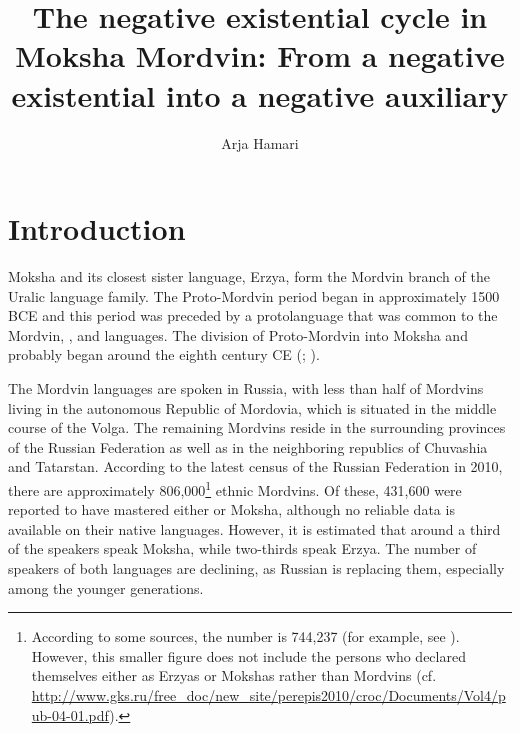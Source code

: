 \documentclass[output=paper,colorlinks,citecolor=brown,draft,draftmode]{langscibook}
\author{Arja Hamari\affiliation{University of Helsinki}}
\title{The negative existential cycle in Moksha Mordvin: From a negative existential into a negative auxiliary}
\begin{document}
\maketitle

\section{Introduction}

Moksha and its closest sister language, Erzya, form the Mordvin branch of the Uralic language family. The Proto-Mordvin period began in approximately 1500 BCE and this period was preceded by a protolanguage that was common to the Mordvin, , and  languages. The division of Proto-Mordvin into Moksha and  probably began around the eighth century CE (\citealt[13--15]{Bartens1999}; \citealt[13–14]{Keresztes2011}).

  The Mordvin languages are spoken in Russia, with less than half of Mordvins living in the autonomous Republic of Mordovia, which is situated in the middle course of the Volga. The remaining Mordvins reside in the surrounding provinces of the Russian Federation as well as in the neighboring republics of Chuvashia and Tatarstan. According to the latest census of the Russian Federation in 2010, there are approximately 806,000\footnote{According to some sources, the number is 744,237 (for example, see \citealt{HamariAasmae2015}). However, this smaller figure does not include the persons who declared themselves either as Erzyas or Mokshas rather than Mordvins (cf. \href{http://www.gks.ru/free\_doc/new\_site/perepis2010/croc/Documents/Vol4/pub-04-01.pdf}{http://www.gks.ru/free\_doc/new\_site/perepis2010/croc/Documents/Vol4/pub-04-01.pdf}).} ethnic Mordvins. Of these, 431,600 were reported to have mastered either  or Moksha, although no reliable data is available on their native languages. However, it is estimated that around a third of the speakers speak Moksha, while two-thirds speak Erzya. The number of speakers of both languages are declining, as Russian is replacing them, especially among the younger generations.
\end{document}
